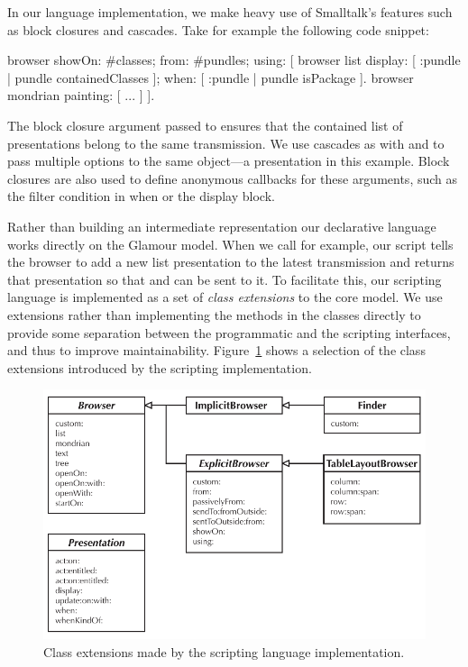 \documentclass[a4paper,10pt,twoside]{book}
\begin{document}
In our language implementation, we make heavy use of Smalltalk's
features such as block closures and cascades. Take for example the
following code snippet:

\begin{code}{}
browser showOn: #classes; from: #pundles; using: [
	browser list
		display: [ :pundle | pundle containedClasses ];
		when: [ :pundle | pundle isPackage ].
	browser mondrian painting: [ ... ]
].
\end{code}

The block closure argument passed to  ensures that the contained list of presentations belong to the same transmission. We use cascades as with  and  to pass multiple options to the same object---a presentation in this example. Block closures are also used to define anonymous callbacks for these arguments, such as the filter condition in when or the display block. 

Rather than building an intermediate representation our declarative language works directly on the Glamour model. When we call  for example, our script tells the browser to add a new list presentation to the latest transmission and returns that presentation so that  and  can be sent to it. To facilitate this, our scripting language is implemented as a set of \emph{class extensions} to the core model. We use extensions rather than implementing the methods in the classes directly to provide some separation between the programmatic and the scripting interfaces, and thus to improve maintainability. Figure~\ref{fig:uml-script_extensions} shows a selection of the class extensions introduced by the scripting implementation.

\begin{figure}[htbp]
\centerline{\includegraphics[width=\linewidth]{script_extensions.pdf}}
\caption{Class extensions made by the scripting language implementation.}
\label{fig:uml-script_extensions}
\end{figure}
\end{document}
